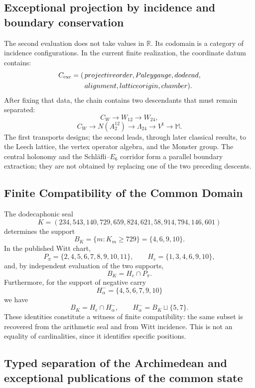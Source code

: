 \subsection{Exceptional projection by incidence and boundary conservation}

The second evaluation does not take values in \(\mathbb R\). Its codomain is a
category of incidence configurations. In the current finite realization,
the coordinate datum contains:
\[
 \begin{aligned}
 C_{\rm exc}=(\,&\text{projective order},\text{Paley gauge},
 \text{dodecad},\\
 &\text{alignment},\text{lattice origin},\text{chamber}).
 \end{aligned}
\]
After fixing that data, the chain contains two descendants that must remain separated:
\[
 C_W\longrightarrow W_{12}\longrightarrow W_{24},
\]
\[
 C_W\longrightarrow N(A_2^{12})
 \longrightarrow\Lambda_{24}
 \longrightarrow V^\natural
 \longrightarrow\mathbb M.
\]
The first transports designs; the second leads, through later
classical results, to the Leech lattice, the vertex operator algebra, and
the Monster group. The central holonomy and the
Schläfli--\(E_6\) corridor form a parallel boundary extraction; they are not obtained
by replacing one of the two preceding descents.

\subsection{Finite Compatibility of the Common Domain}

The dodecaphonic seal
\[
 K=(234,543,140,729,659,824,621,58,914,794,146,601)
\]
determines the support
\[
 B_K=\{m:K_m\geq729\}=\{4,6,9,10\}.
\]
In the published Witt chart,
\[
 P_\pi=\{2,4,5,6,7,8,9,10,11\},
 \qquad
 H_e=\{1,3,4,6,9,10\},
\]
and, by independent evaluation of the two supports,
\[
 \boxed{B_K=H_e\cap P_\pi.}
\]
Furthermore, for the support of negative carry
\[
 H_\alpha^-=\{4,5,6,7,9,10\}
\]
we have
\[
 B_K=H_e\cap H_\alpha^-,
 \qquad H_\alpha^-=B_K\sqcup\{5,7\}.
\]
These identities constitute a witness of finite compatibility: the same
subset is recovered from the arithmetic seal and from Witt
incidence. This is not an equality of cardinalities, since it identifies specific
positions.

\subsection{Typed separation of the Archimedean and exceptional publications of the common state}

